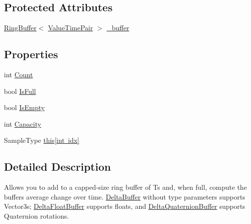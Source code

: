 \subsection*{Protected Attributes}
\begin{DoxyCompactItemize}
\item 
\mbox{\hyperlink{class_leap_1_1_unity_1_1_ring_buffer}{Ring\+Buffer}}$<$ \mbox{\hyperlink{struct_leap_1_1_unity_1_1_delta_buffer_1_1_value_time_pair}{Value\+Time\+Pair}} $>$ \mbox{\hyperlink{class_leap_1_1_unity_1_1_delta_buffer_a6ef609a3d4a68dabb789e35dcf824135}{\+\_\+buffer}}
\end{DoxyCompactItemize}
\subsection*{Properties}
\begin{DoxyCompactItemize}
\item 
int \mbox{\hyperlink{class_leap_1_1_unity_1_1_delta_buffer_a0df28688269e439fe3dcf772f1e6cbec}{Count}}
\item 
bool \mbox{\hyperlink{class_leap_1_1_unity_1_1_delta_buffer_a1c03628f8d8e18b96656c5dfa632ce54}{Is\+Full}}
\item 
bool \mbox{\hyperlink{class_leap_1_1_unity_1_1_delta_buffer_ac588b2d5fefc545dbdec09b307706314}{Is\+Empty}}
\item 
int \mbox{\hyperlink{class_leap_1_1_unity_1_1_delta_buffer_aa7a81d7bc8dd666acbdef3d22374aed3}{Capacity}}
\item 
Sample\+Type \mbox{\hyperlink{class_leap_1_1_unity_1_1_delta_buffer_a2a84d086d6edb34a7f6c249cea7b4acf}{this\mbox{[}int idx\mbox{]}}}
\end{DoxyCompactItemize}


\subsection{Detailed Description}
Allows you to add to a capped-\/size ring buffer of Ts and, when full, compute the buffer\textquotesingle{}s average change over time. \mbox{\hyperlink{class_leap_1_1_unity_1_1_delta_buffer}{Delta\+Buffer}} without type parameters supports Vector3s; \mbox{\hyperlink{class_leap_1_1_unity_1_1_delta_float_buffer}{Delta\+Float\+Buffer}} supports floats, and \mbox{\hyperlink{class_leap_1_1_unity_1_1_delta_quaternion_buffer}{Delta\+Quaternion\+Buffer}} supports Quaternion rotations. 


